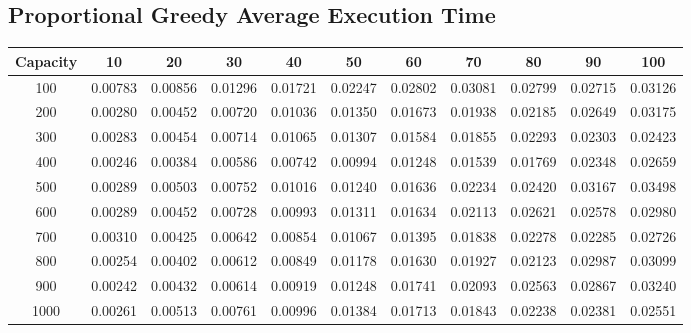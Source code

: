 \documentclass{article}
\begin{document}
\subsection{Proportional Greedy Average Execution Time}
\begin{center}
\begin{tabular}{ccccccccccc}
\toprule
Capacity & 10 & 20 & 30 & 40 & 50 & 60 & 70 & 80 & 90 & 100 \\
\midrule
100 & 0.00783 & 0.00856 & 0.01296 & 0.01721 & 0.02247 & 0.02802 & 0.03081 & 0.02799 & 0.02715 & 0.03126 \\
200 & 0.00280 & 0.00452 & 0.00720 & 0.01036 & 0.01350 & 0.01673 & 0.01938 & 0.02185 & 0.02649 & 0.03175 \\
300 & 0.00283 & 0.00454 & 0.00714 & 0.01065 & 0.01307 & 0.01584 & 0.01855 & 0.02293 & 0.02303 & 0.02423 \\
400 & 0.00246 & 0.00384 & 0.00586 & 0.00742 & 0.00994 & 0.01248 & 0.01539 & 0.01769 & 0.02348 & 0.02659 \\
500 & 0.00289 & 0.00503 & 0.00752 & 0.01016 & 0.01240 & 0.01636 & 0.02234 & 0.02420 & 0.03167 & 0.03498 \\
600 & 0.00289 & 0.00452 & 0.00728 & 0.00993 & 0.01311 & 0.01634 & 0.02113 & 0.02621 & 0.02578 & 0.02980 \\
700 & 0.00310 & 0.00425 & 0.00642 & 0.00854 & 0.01067 & 0.01395 & 0.01838 & 0.02278 & 0.02285 & 0.02726 \\
800 & 0.00254 & 0.00402 & 0.00612 & 0.00849 & 0.01178 & 0.01630 & 0.01927 & 0.02123 & 0.02987 & 0.03099 \\
900 & 0.00242 & 0.00432 & 0.00614 & 0.00919 & 0.01248 & 0.01741 & 0.02093 & 0.02563 & 0.02867 & 0.03240 \\
1000 & 0.00261 & 0.00513 & 0.00761 & 0.00996 & 0.01384 & 0.01713 & 0.01843 & 0.02238 & 0.02381 & 0.02551 \\
\bottomrule
\end{tabular}
\end{center}
\end{document}
